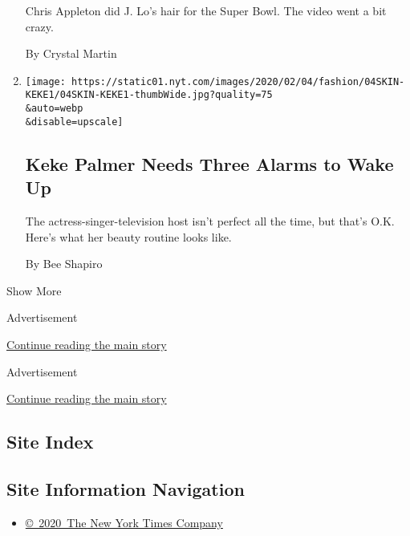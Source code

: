 \begin{enumerate}
  Chris Appleton did J. Lo's hair for the Super Bowl. The video went a
  bit crazy.

  By Crystal Martin
\item
  \href{/2020/02/04/style/keke-palmer-needs-three-alarms-to-wake-up.html}{}

  \texttt{[image: https://static01.nyt.com/images/2020/02/04/fashion/04SKIN-KEKE1/04SKIN-KEKE1-thumbWide.jpg?quality=75\\\&auto=webp\\\&disable=upscale]}

  \hypertarget{keke-palmer-needs-three-alarms-to-wake-up}{%
  \subsection{Keke Palmer Needs Three Alarms to Wake
  Up}\label{keke-palmer-needs-three-alarms-to-wake-up}}

  The actress-singer-television host isn't perfect all the time, but
  that's O.K. Here's what her beauty routine looks like.

  By Bee Shapiro
\end{enumerate}

Show More

Advertisement

\protect\hyperlink{after-mid2}{Continue reading the main story}

Advertisement

\protect\hyperlink{after-mktg}{Continue reading the main story}

\hypertarget{site-index}{%
\subsection{Site Index}\label{site-index}}

\hypertarget{site-information-navigation}{%
\subsection{Site Information
Navigation}\label{site-information-navigation}}

\begin{itemize}
\tightlist
\item
  \href{https://help.nytimes.com/hc/en-us/articles/115014792127-Copyright-notice}{©~2020~The
  New York Times Company}
\end{itemize}

